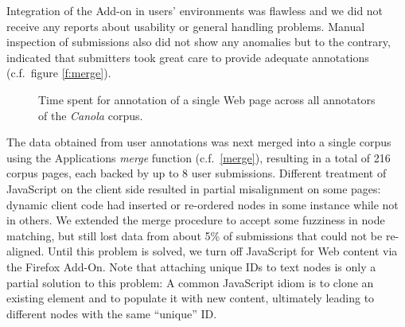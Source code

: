 Integration of the Add-on in users' environments was flawless and we did not receive any reports about usability or general handling problems.
Manual inspection of submissions also did not show any anomalies but to the contrary, indicated that submitters took great care to provide adequate annotations (c.f.~figure \ref{f:merge}).

\begin{figure}[h]
\centering
{}
\caption{
\label{f:userstats}
\label{ens1}
	Time spent for annotation of a single Web page across all annotators of the \textit{Canola} corpus.}
\end{figure}

The data obtained from user annotations was next merged into a single corpus using the Applications \textit{merge} function (c.f.~\ref{merge}), resulting in a total of 216 corpus pages, each backed by up to 8 user submissions.
Different treatment of JavaScript on the client side resulted in partial misalignment on some pages:
dynamic client code had inserted or re-ordered nodes in some instance while not in others.
We extended the merge procedure to accept some fuzziness in node matching, but still lost data from about 5\% of submissions that could not be re-aligned.
Until this problem is solved, we turn off JavaScript for Web content via the Firefox Add-On.
Note that attaching unique IDs to text nodes is only a partial solution to this problem:
A common JavaScript idiom is to clone an existing element and to populate it with new content, ultimately leading to different nodes with the same ``unique'' ID. 

